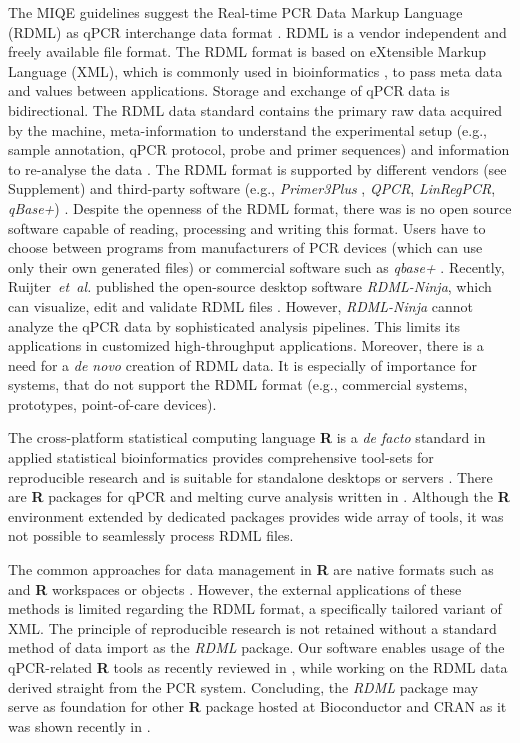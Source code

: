 \documentclass{bioinfo}
\begin{document}
The MIQE guidelines suggest the Real-time PCR Data Markup Language (RDML) as 
qPCR interchange data format \cite{rdml-ninja_2015}. RDML is a vendor 
independent and freely available file format. The RDML format is based on 
eXtensible Markup Language (XML), which is commonly used in bioinformatics 
\cite{achard_xml_2001}, to pass meta data and values between applications. 
Storage and exchange of qPCR data is bidirectional. The RDML data standard 
contains the primary raw data acquired by the machine, meta-information to 
understand the experimental setup (e.g., sample annotation, qPCR protocol, probe 
and primer sequences) and information to re-analyse the data 
\cite{lefever_rdml_2009}. The RDML format is supported by different vendors (see 
Supplement) and third-party software (e.g., \textit{Primer3Plus} 
\cite{untergasser_2007}, \textit{QPCR}, \textit{LinRegPCR}, \textit{qBase+}) 
\cite{pabinger_2014, rdml-ninja_2015}. Despite the openness of the RDML format, 
there was is no open source software capable of reading, processing and writing 
this format. Users have to choose between programs from manufacturers of PCR 
devices (which can use only their own generated files) or commercial software 
such as \textit{qbase+} \cite{pabinger_2014, rdml-ninja_2015}. Recently, 
Ruijter~\textit{et~al.} published the open-source desktop software 
\textit{RDML-Ninja}, which can visualize, edit and validate RDML files 
\cite{rdml-ninja_2015}. However, \textit{RDML-Ninja} cannot analyze the qPCR 
data by sophisticated analysis pipelines. This limits its applications in 
customized high-throughput applications. Moreover, there is a need for a \textit{de novo} 
creation of RDML data.  It is especially of importance for systems, that do not 
support the RDML format (e.g., commercial systems, prototypes, point-of-care devices). 

The cross-platform statistical computing language \textbf{R} is a \textit{de facto} standard in applied 
statistical bioinformatics provides comprehensive tool-sets for reproducible research \cite{leeper_archiving_2014, 
liu_r_2014, roediger2015r} and is suitable for standalone desktops or servers \cite{roediger2015r}. 
There are \textbf{R} packages for qPCR and melting 
curve analysis written in \cite{pabinger_2014, ritz_qpcr_2008, 
roediger_RJ_2013, roediger2015chippcr}. Although the \textbf{R} environment 
extended by dedicated packages provides wide array of tools, it was not possible 
to seamlessly process RDML files.

The common approaches for data management in \textbf{R} are native formats such 
as and \textbf{R} workspaces or objects \cite{roediger_rkward_2012}. However, 
the external applications of these methods is limited regarding the RDML format, 
a specifically tailored variant of XML. The principle of reproducible research 
is not retained without a standard method of data import as the \textit{RDML} 
package. Our software enables usage of the qPCR-related \textbf{R} tools as 
recently reviewed in \cite{pabinger_2014}, while working on the RDML data 
derived straight from the PCR system. Concluding, the \textit{RDML} package may 
serve as foundation for other \textbf{R} package hosted at Bioconductor 
\cite{gentleman_2004} and CRAN as it was shown recently in \cite{roediger2015r}.
\end{document}
